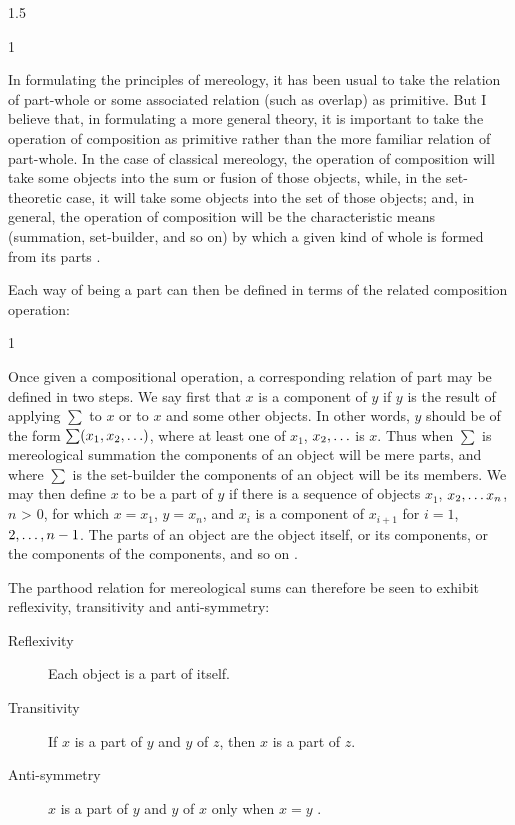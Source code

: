 \documentclass[11pt]{article}
\newenvironment{squote}{%
\begin{spacing}{1}
\begin{list}{}{%
\setlength{\labelwidth}{0pt}%
\rightmargin\leftmargin%
}
\item\relax
}{%
\end{list}%
\end{spacing}
}
\begin{document}
\begin{spacing}{1.5}
\begin{squote}
In formulating the principles of mereology, it has been usual to take
the relation of part-whole or some associated relation (such as
overlap) as primitive.  But I believe that, in formulating a more
general theory, it is important to take the operation of composition
as primitive rather than the more familiar relation of part-whole.  In
the case of classical mereology, the operation of composition will
take some objects into the sum or fusion of those objects, while, in
the set-theoretic case, it will take some objects into the set of
those objects; and, in general, the operation of composition will be
the characteristic means (summation, set-builder, and so on) by which
a given kind of whole is formed from its parts \citep[565]{fine2010}.
\end{squote}

Each way of being a part can then be defined in terms of the related
composition operation:

\begin{squote}
Once given a compositional operation, a corresponding relation of part
may be defined in two steps.  We say first that $x$ is a component of
$y$ if $y$ is the result of applying $\sum$ to $x$ or to $x$ and some
other objects.  In other words, $y$ should be of the form $\sum
(x_{1}, x_{2}, \mathellipsis )$, where at least one of $x_1$, $x_2,
\mathellipsis$ is $x$.  Thus when $\sum$ is mereological summation the
components of an object will be mere parts, and where $\sum$ is the
set-builder the components of an object will be its members.  We may
then define $x$ to be a part of $y$ if there is a sequence of objects
$x_1$, $x_2, \mathellipsis x_n$, $n$ \textgreater{} $0$, for which $x
= x_1$, $y = x_n$, and $x_i$ is a component of $x_{i+1}$ for $i = 1$,
$2, \mathellipsis, n-1$. The parts of an object are the object itself,
or its components, or the components of the components, and so on
\citep[567--568]{fine2010}.
\end{squote}

The parthood relation for mereological sums can therefore be seen to
exhibit reflexivity, transitivity and anti-symmetry:

\begin{description}
\item[Reflexivity] Each object is a part of itself.
\item[Transitivity] If $x$ is a part of $y$ and $y$ of $z$, then $x$
  is a part of $z$.
\item[Anti-symmetry] $x$ is a part of $y$ and $y$ of $x$ only when $x
  = y$ \citep[568]{fine2010}.
\end{description}


\end{spacing}
\end{document}
